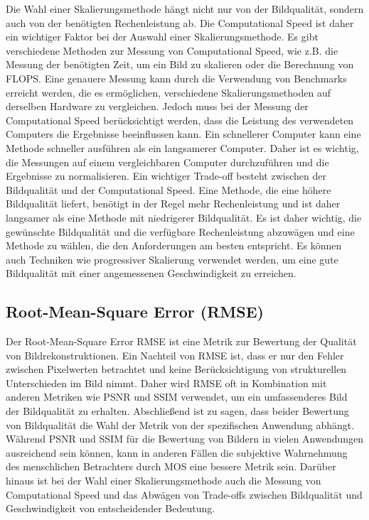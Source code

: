         Die Wahl einer Skalierungsmethode hängt nicht nur von der Bildqualität, sondern auch von der benötigten Rechenleistung ab. 
        Die Computational Speed ist daher ein wichtiger Faktor bei der Auswahl einer Skalierungsmethode.
        Es gibt verschiedene Methoden zur Messung von Computational Speed, wie z.B. die Messung der benötigten Zeit, um ein Bild zu skalieren oder die Berechnung von \ac{FLOPS}. 
        Eine genauere Messung kann durch die Verwendung von Benchmarks erreicht werden, die es ermöglichen, verschiedene Skalierungsmethoden auf derselben Hardware zu vergleichen.
        Jedoch muss bei der Messung der Computational Speed berücksichtigt werden, dass die Leistung des verwendeten Computers die Ergebnisse beeinflussen kann. 
        Ein schnellerer Computer kann eine Methode schneller ausführen als ein langsamerer Computer. 
        Daher ist es wichtig, die Messungen auf einem vergleichbaren Computer durchzuführen und die Ergebnisse zu normalisieren.
        Ein wichtiger Trade-off besteht zwischen der Bildqualität und der Computational Speed. 
        Eine Methode, die eine höhere Bildqualität liefert, benötigt in der Regel mehr Rechenleistung und ist daher langsamer als eine Methode mit niedrigerer Bildqualität. 
        Es ist daher wichtig, die gewünschte Bildqualität und die verfügbare Rechenleistung abzuwägen und eine Methode zu wählen, die den Anforderungen am besten entspricht. 
        Es können auch Techniken wie progressiver Skalierung verwendet werden, um eine gute Bildqualität mit einer angemessenen Geschwindigkeit zu erreichen.
        
    \subsection{Root-Mean-Square Error (RMSE)}
    
        Der Root-Mean-Square Error \ac{RMSE} ist eine Metrik zur Bewertung der Qualität von Bildrekonstruktionen. 
        Ein Nachteil von RMSE ist, dass er nur den Fehler zwischen Pixelwerten betrachtet und keine Berücksichtigung von strukturellen Unterschieden im Bild nimmt. 
        Daher wird RMSE oft in Kombination mit anderen Metriken wie \ac{PSNR} und \ac{SSIM} verwendet, um ein umfassenderes Bild der Bildqualität zu erhalten.
        Abschließend ist zu sagen, dass beider Bewertung von Bildqualität die Wahl der Metrik von der spezifischen Anwendung abhängt. 
        Während \ac{PSNR} und \ac{SSIM} für die Bewertung von Bildern in vielen Anwendungen ausreichend sein können, kann in anderen Fällen die subjektive Wahrnehmung des menschlichen Betrachters durch MOS eine bessere Metrik sein.
        Darüber hinaus ist bei der Wahl einer Skalierungsmethode auch die Messung von Computational Speed und das Abwägen von Trade-offs zwischen Bildqualität und Geschwindigkeit von entscheidender Bedeutung.
        
